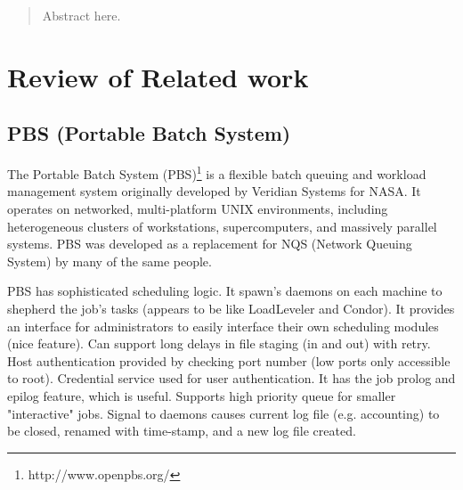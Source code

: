 \maketitle

\begin{abstract}
Abstract here.
\end{abstract}

\newpage

\section{Review of Related work}

\subsection{PBS (Portable Batch System)}

The Portable Batch System (PBS)\footnote{http://www.openpbs.org/}
is a flexible batch queuing and 
workload management system originally developed by Veridian Systems 
for NASA.  It operates on networked, multi-platform UNIX environments, 
including heterogeneous clusters of workstations, supercomputers, and 
massively parallel systems. PBS was developed as a replacement for 
NQS (Network Queuing System) by many of the same people.

PBS has sophisticated scheduling logic. It spawn's daemons on each 
machine to shepherd the job's tasks (appears to be like LoadLeveler 
and Condor). It provides an interface for administrators to easily 
interface their own scheduling modules (nice feature).  Can support 
long delays in file staging (in and out) with retry.  Host 
authentication provided by checking port number (low ports only 
accessible to root).  Credential service used for user authentication. 
It has the job prolog and epilog feature, which is useful.  Supports 
high priority queue for smaller "interactive" jobs.  Signal to daemons 
causes current log file (e.g. accounting) to be closed, renamed with 
time-stamp, and a new log file created.


